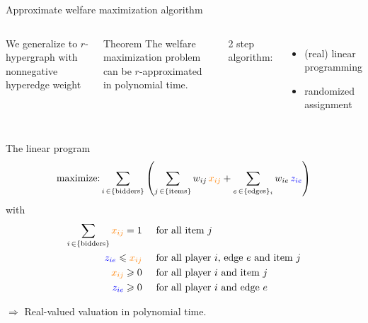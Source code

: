 \documentclass[aspectratio=169]{beamer}
\begin{document}
\begin{frame}{Approximate welfare maximization algorithm}
    \begin{columns}
        We generalize to $r$-hypergraph with \alert{nonnegative hyperedge weight}

        \begin{block}{Theorem}
            The welfare maximization problem can be \(r\)-approximated in polynomial time.
        \end{block}

        2 step algorithm:
        \begin{itemize}
            \item (real) linear programming
            \item randomized assignment
        \end{itemize}
    \end{columns}
\end{frame}

\begin{frame}{The linear program}
    \[
        \text{maximize:} \sum_{i \,\in \{\text{bidders}\}} \left(
            \sum_{j \,\in \{\text{items}\}} w_{ij}\, {\color{orange} x_{ij}}
            + \sum_{e \,\in \{\text{edges}\}_i} w_{ie}\, {\color{blue} z_{ie}}
        \right)
    \]
    with
    \begin{align*}
        \sum_{i \,\in \{\text{bidders}\}} {\color{orange} x_{ij}}  = 1 & \hspace{.5cm} \text{for all item \(j\)}\\
        {\color{blue} z_{ie}}  \leqslant {\color{orange} x_{ij}} & \hspace{.5cm} \text{for all player \(i\), edge \(e\) and item \(j\)}\\
        {\color{orange} x_{ij}}   \geqslant 0 & \hspace{.5cm} \text{for all player \(i\) and item \(j\)}\\
        {\color{blue} z_{ie}}  \geqslant 0 & \hspace{.5cm} \text{for all player \(i\) and edge \(e\)}
    \end{align*}

    $\Rightarrow$ Real-valued valuation in \alert{polynomial time}.
\end{frame}
\end{document}
